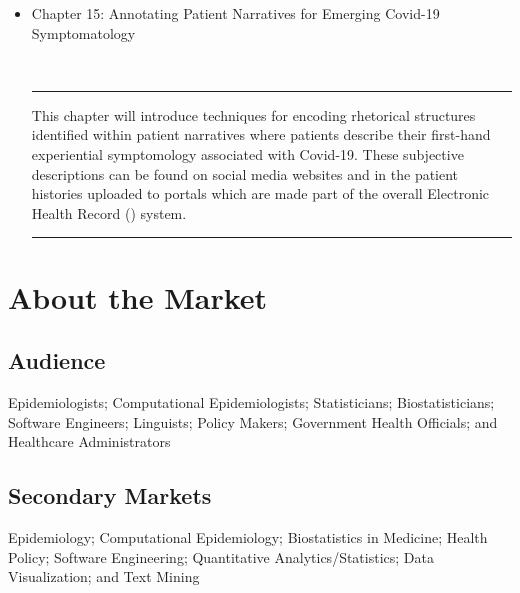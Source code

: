 \documentclass{statsoc}
\newcommand{\p}[1]{

\vspace{.75em}#1}
\newcommand{\textscc}[1]{{\color{orr!35!black}{{%
						\fontfamily{Cabin-TLF}\fontseries{b}\selectfont{\textsc{\scriptsize{#1}}}}}}}
\newcommand{\AcronymText}[1]{{\textscc{#1}}}
\newcommand{\sEHR}{\resizebox{!}{6.5pt}{\AcronymText{EHR}}}
\newenvironment{summary}{\\\vspace{-4pt}%
%
%
\noindent\hfil\textcolor{rgrey!50!purple}{\rule{0.5\textwidth}{.4pt}}\hfil

\hspace{-2cm}\begin{minipage}{1.02\textwidth}\fontfamily{phv}\fontsize{9}{11}\selectfont}%
{\\\vspace{-1em}\end{minipage}
{\begin{center}\textcolor{rgrey!50!yellow}{\rule{0.5\textwidth}{.4pt}}\end{center}}
\vspace{2em}}%
\begin{document}
{\begin{description}
\begin{itemize}
\item Chapter 15: Annotating Patient Narratives for Emerging 
Covid-19 Symptomatology 

\begin{summary}
This chapter will introduce techniques for encoding 
rhetorical structures identified within patient 
narratives where patients describe their first-hand 
experiential symptomology associated with Covid-19.  
These subjective descriptions can be found 
on social media websites and in the patient histories 
uploaded to portals which are made part of the overall 
Electronic Health Record (\sEHR{}) system.
\end{summary}


\end{itemize}

\end{description}


\section{About the Market}

\subsection{Audience}
\p{Epidemiologists; Computational Epidemiologists; 
Statisticians; Biostatisticians; Software Engineers; 
Linguists; Policy Makers; Government Health Officials; 
and Healthcare Administrators}

\subsection{Secondary Markets}
\p{Epidemiology; Computational Epidemiology; 
Biostatistics in Medicine; 
Health Policy; Software Engineering; 
Quantitative Analytics/Statistics; 
Data Visualization; and Text Mining}

}
\end{document}
